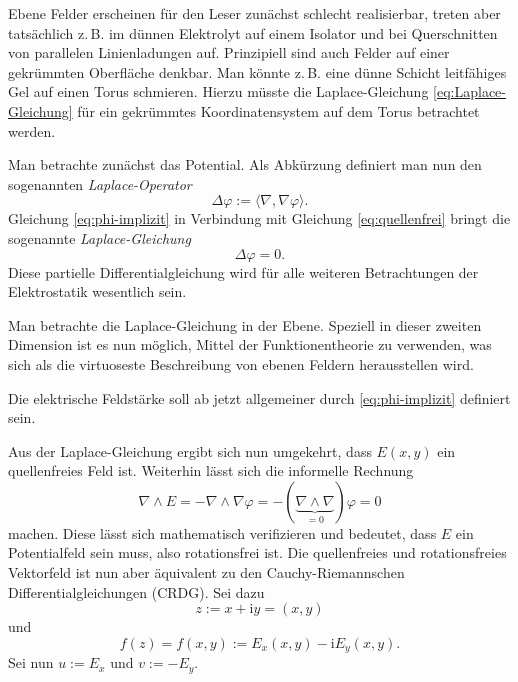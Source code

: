 \documentclass[a4paper,11pt,fleqn,twocolumn,twoside,dvipdfmx]{scrartcl}
\newcommand{\ui}{\mathrm i}
\begin{document}
Ebene Felder erscheinen für den Leser zunächst schlecht realisierbar,
treten aber tatsächlich z.\,B. im dünnen Elektrolyt auf einem
Isolator und bei Querschnitten von parallelen Linienladungen auf.
Prinzipiell sind auch Felder auf einer gekrümmten Oberfläche
denkbar. Man könnte z.\,B. eine dünne Schicht leitfähiges Gel
auf einen Torus schmieren. Hierzu müsste die Laplace-Gleichung
\eqref{eq:Laplace-Gleichung} für ein gekrümmtes Koordinatensystem
auf dem Torus betrachtet werden.

Man betrachte zunächst das Potential.
Als Abkürzung definiert man nun den sogenannten \emph{Laplace-Operator}
\begin{equation}
\Delta\varphi := \langle\nabla,\nabla\varphi\rangle.
\end{equation}
Gleichung
\eqref{eq:phi-implizit} in Verbindung mit Gleichung
\eqref{eq:quellenfrei} bringt die sogenannte \emph{Laplace-Gleichung}
\begin{equation}\label{eq:Laplace-Gleichung}
\Delta\varphi = 0.
\end{equation}
Diese partielle Differentialgleichung wird für alle weiteren
Betrachtungen der Elektrostatik wesentlich sein.

Man betrachte die Laplace-Gleichung in der Ebene.
Speziell in dieser zweiten Dimension ist es nun möglich,
Mittel der Funktionentheorie zu verwenden,
was sich als die virtuoseste Beschreibung von ebenen Feldern
herausstellen wird.

Die elektrische Feldstärke soll ab jetzt allgemeiner durch
\eqref{eq:phi-implizit} definiert sein.

Aus der Laplace-Gleichung ergibt sich nun umgekehrt, dass $E(x,y)$
ein quellenfreies Feld ist. Weiterhin lässt sich die
informelle Rechnung
\begin{equation}
\nabla\wedge E
= -\nabla\wedge\nabla\varphi
= -(\underbrace{\nabla\wedge\nabla}_{=0})\varphi =0
\end{equation}
machen. Diese lässt sich mathematisch verifizieren und bedeutet,
dass $E$ ein Potentialfeld sein muss, also rotationsfrei ist.
Die quellenfreies und rotationsfreies Vektorfeld ist nun aber
äquivalent zu den Cauchy-Riemannschen Differentialgleichungen
(CRDG). Sei dazu
\begin{equation}
z:=x+\ui y=(x,y)
\end{equation}
und
\begin{equation}
f(z)=f(x,y):=E_x(x,y)-\mathrm{i}E_y(x,y).
\end{equation}
Sei nun $u:=E_x$ und $v:=-E_y$.
\end{document}

